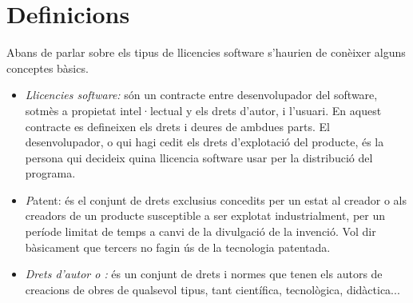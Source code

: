 \section{Definicions}
Abans de parlar sobre els tipus de llicencies software s'haurien de conèixer alguns conceptes bàsics.
\begin {itemize}
	\item \emph{Llicencies software:} són un contracte entre desenvolupador del software, sotmès a 		propietat intel·lectual y els drets d'autor, i l'usuari. En aquest contracte es defineixen els drets i 		deures de ambdues parts. El desenvolupador, o qui hagi cedit els drets d'explotació del producte, és 		la persona qui decideix quina llicencia software usar per la distribució del programa.
	\item \emph Patent: és el conjunt de drets exclusius concedits per un estat al creador o als creadors 		de un producte susceptible a ser explotat industrialment, per un període limitat de temps a canvi 		de la divulgació de la invenció. Vol dir bàsicament que tercers no fagin ús de la tecnologia patentada.
	\item \emph{Drets d'autor o :} és un conjunt de drets i normes que tenen els 		autors de creacions de obres de qualsevol tipus, tant científica, tecnològica, didàctica...
\end {itemize}
